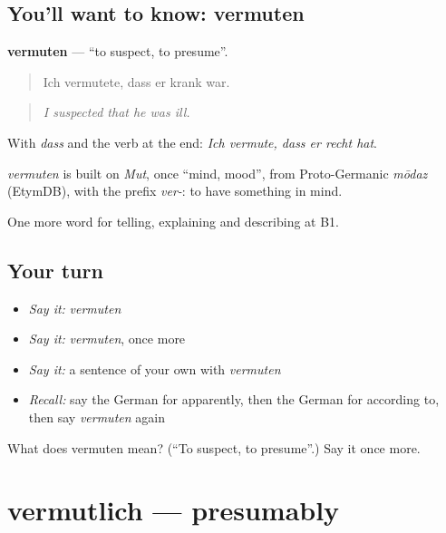 \subsection*{You'll want to know: vermuten}
\textbf{vermuten} — \textquotedblleft{}to suspect, to presume\textquotedblright{}.

\begin{quote}
Ich vermutete, dass er krank war.
\end{quote}

\begin{quote}
\emph{I suspected that he was ill.}
\end{quote}

With \emph{dass} and the verb at the end: \emph{Ich vermute, dass er recht hat}.

\begin{cousinweb}
\emph{vermuten} is built on \emph{Mut}, once \textquotedblleft{}mind, mood\textquotedblright{}, from Proto-Germanic \emph{mōdaz} (EtymDB), with the prefix \emph{ver-}: to have something in mind.
\end{cousinweb}

\begin{grammarlens}[title={What you've built}]
One more word for telling, explaining and describing at B1.
\end{grammarlens}

\subsection*{Your turn}
\begin{itemize}
\raggedright
  \item \emph{Say it:} \emph{vermuten}
  \item \emph{Say it:} \emph{vermuten}, once more
  \item \emph{Say it:} a sentence of your own with \emph{vermuten}
  \item \emph{Recall:} say the German for apparently, then the German for according to, then say \emph{vermuten} again
\end{itemize}

\begin{tcolorbox}[breakable,colback=teal!4,colframe=teal!35!black,title={Before you move on}]
What does vermuten mean? (\textquotedblleft{}To suspect, to presume\textquotedblright{}.) Say it once more.
\end{tcolorbox}
\section[vermutlich]{vermutlich — presumably}

